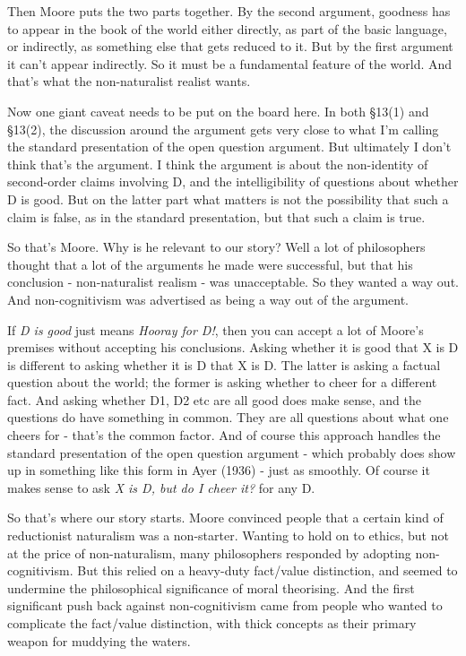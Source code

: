\documentclass[
]{article}
\begin{document}
Then Moore puts the two parts together. By the second argument, goodness
has to appear in the book of the world either directly, as part of the
basic language, or indirectly, as something else that gets reduced to
it. But by the first argument it can't appear indirectly. So it must be
a fundamental feature of the world. And that's what the non-naturalist
realist wants.

Now one giant caveat needs to be put on the board here. In both §13(1)
and §13(2), the discussion around the argument gets very close to what
I'm calling the standard presentation of the open question argument. But
ultimately I don't think that's the argument. I think the argument is
about the non-identity of second-order claims involving D, and the
intelligibility of questions about whether D is good. But on the latter
part what matters is not the possibility that such a claim is false, as
in the standard presentation, but that such a claim is true.

So that's Moore. Why is he relevant to our story? Well a lot of
philosophers thought that a lot of the arguments he made were
successful, but that his conclusion - non-naturalist realism - was
unacceptable. So they wanted a way out. And non-cognitivism was
advertised as being a way out of the argument.

If \emph{D is good} just means \emph{Hooray for D!}, then you can accept
a lot of Moore's premises without accepting his conclusions. Asking
whether it is good that X is D is different to asking whether it is D
that X is D. The latter is asking a factual question about the world;
the former is asking whether to cheer for a different fact. And asking
whether D1, D2 etc are all good does make sense, and the questions do
have something in common. They are all questions about what one cheers
for - that's the common factor. And of course this approach handles the
standard presentation of the open question argument - which probably
does show up in something like this form in Ayer (1936) - just as
smoothly. Of course it makes sense to ask \emph{X is D, but do I cheer
it?} for any D.

So that's where our story starts. Moore convinced people that a certain
kind of reductionist naturalism was a non-starter. Wanting to hold on to
ethics, but not at the price of non-naturalism, many philosophers
responded by adopting non-cognitivism. But this relied on a heavy-duty
fact/value distinction, and seemed to undermine the philosophical
significance of moral theorising. And the first significant push back
against non-cognitivism came from people who wanted to complicate the
fact/value distinction, with thick concepts as their primary weapon for
muddying the waters.
\end{document}
